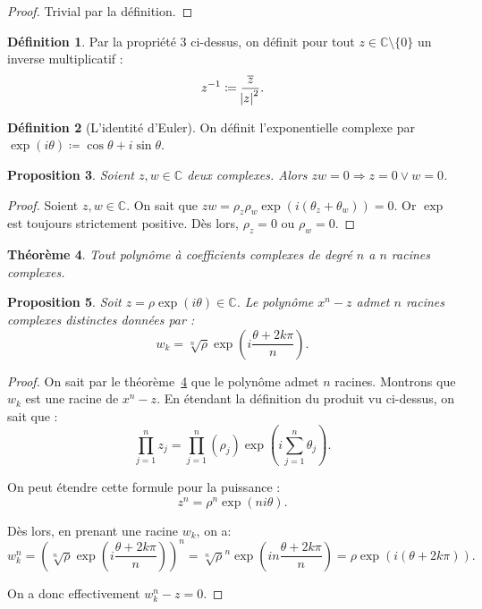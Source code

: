 \documentclass{article}
\newcommand{\C}{\mathbb C}
\newtheorem{thm}{Théorème}[section]
\newtheorem{prp}[thm]{Proposition}
\theoremstyle{definition}
\newtheorem{déf}[thm]{Définition}
\theoremstyle{remark}
\begin{document}
		\begin{proof} Trivial par la définition. \end{proof}

		\begin{déf} Par la propriété 3 ci-dessus, on définit pour tout $z \in \C \setminus \{0\}$ un inverse multiplicatif :
			\[z^{-1} \coloneqq \frac {\overline z}{\abs z^2}.\]
		\end{déf}

		\begin{déf}[L'identité d'Euler] On définit l'exponentielle complexe par $\exp(i\theta) \coloneqq \cos\theta + i\sin\theta$. \end{déf}

		\begin{prp} Soient $z, w \in \C$ deux complexes. Alors $zw = 0 \Rightarrow z=0 \lor w=0$. \end{prp}

		\begin{proof} Soient $z, w \in \C$. On sait que $zw = \rho_z\rho_w\exp(i(\theta_z+\theta_w)) = 0$. Or $\exp$ est toujours strictement positive.
		Dès lors, $\rho_z=0$ ou $\rho_w=0$. \end{proof}

		\begin{thm}\label{thmFondamental} Tout polynôme à coefficients complexes de degré $n$ a $n$ racines complexes. \end{thm}

		\begin{prp} Soit $z = \rho \exp(i\theta) \in \C$. Le polynôme $x^n - z$ admet $n$ racines complexes distinctes données par :
		\[w_k = \sqrt[n]\rho\exp\left(i\frac {\theta+2k\pi}n\right).\]\end{prp}

		\begin{proof} On sait par le théorème~\ref{thmFondamental} que le polynôme admet $n$ racines. Montrons que $w_k$ est une racine de $x^n-z$. En étendant la définition
		du produit vu ci-dessus, on sait que : \[\prod_{j=1}^nz_j = \prod_{j=1}^n(\rho_j)\exp\left(i\sum_{j=1}^n\theta_j\right).\]

		On peut étendre cette formule pour la puissance : \[z^n = \rho^n\exp(ni\theta).\]

		Dès lors, en prenant une racine $w_k$, on a:
		\[w_k^n = \left(\sqrt[n]\rho\exp\left(i\frac {\theta+2k\pi}n\right)\right)^n = \sqrt[n]\rho^n\exp\left(in\frac {\theta+2k\pi}n\right) = \rho\exp(i(\theta+2k\pi)).\]

		On a donc effectivement $w_k^n-z = 0$. \end{proof}
\end{document}
